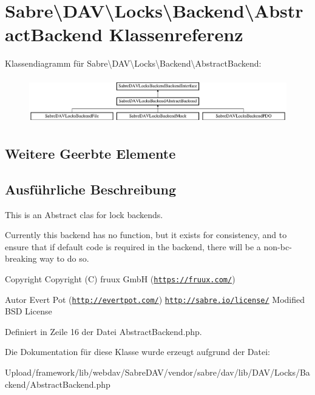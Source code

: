 \hypertarget{class_sabre_1_1_d_a_v_1_1_locks_1_1_backend_1_1_abstract_backend}{}\section{Sabre\textbackslash{}D\+AV\textbackslash{}Locks\textbackslash{}Backend\textbackslash{}Abstract\+Backend Klassenreferenz}
\label{class_sabre_1_1_d_a_v_1_1_locks_1_1_backend_1_1_abstract_backend}
Klassendiagramm für Sabre\textbackslash{}D\+AV\textbackslash{}Locks\textbackslash{}Backend\textbackslash{}Abstract\+Backend\+:\begin{figure}[H]
\begin{center}
\leavevmode
\includegraphics[height=2.014389cm]{class_sabre_1_1_d_a_v_1_1_locks_1_1_backend_1_1_abstract_backend}
\end{center}
\end{figure}
\subsection*{Weitere Geerbte Elemente}


\subsection{Ausführliche Beschreibung}
This is an Abstract clas for lock backends.

Currently this backend has no function, but it exists for consistency, and to ensure that if default code is required in the backend, there will be a non-\/bc-\/breaking way to do so.

\begin{DoxyCopyright}{Copyright}
Copyright (C) fruux GmbH (\href{https://fruux.com/}{\tt https\+://fruux.\+com/}) 
\end{DoxyCopyright}
\begin{DoxyAuthor}{Autor}
Evert Pot (\href{http://evertpot.com/}{\tt http\+://evertpot.\+com/})  \href{http://sabre.io/license/}{\tt http\+://sabre.\+io/license/} Modified B\+SD License 
\end{DoxyAuthor}


Definiert in Zeile 16 der Datei Abstract\+Backend.\+php.



Die Dokumentation für diese Klasse wurde erzeugt aufgrund der Datei\+:\begin{DoxyCompactItemize}
\item 
Upload/framework/lib/webdav/\+Sabre\+D\+A\+V/vendor/sabre/dav/lib/\+D\+A\+V/\+Locks/\+Backend/Abstract\+Backend.\+php\end{DoxyCompactItemize}
